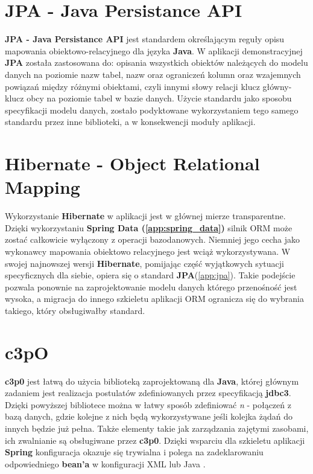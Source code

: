 \section{JPA - Java Persistance API}\label{tech:jpa}
	\textbf{JPA - Java Persistance API} jest standardem określającym reguły opisu mapowania obiektowo-relacyjnego dla języka \textbf{Java}. W aplikacji demonstracyjnej \textbf{JPA} została zastosowana do: opisania wszystkich obiektów należących do modelu danych na poziomie nazw tabel, nazw oraz ograniczeń kolumn oraz wzajemnych powiązań między różnymi obiektami, czyli innymi słowy relacji klucz główny-klucz obcy na poziomie tabel w bazie danych. Użycie standardu jako sposobu specyfikacji modelu danych, zostało podyktowane wykorzystaniem tego samego standardu przez inne biblioteki, a w konsekwencji moduły aplikacji. 
	
\section{Hibernate - Object Relational Mapping}\label{tech:hibernate}
	Wykorzystanie \textbf{Hibernate} w aplikacji jest w głównej mierze transparentne. Dzięki wykorzystaniu \textbf{Spring Data (\ref{app:spring_data})}
	silnik ORM może zostać całkowicie wyłączony z operacji bazodanowych. Niemniej jego cecha jako wykonawcy mapowania obiektowo relacyjnego jest wciąż wykorzystywana. W swojej najnowszej wersji \textbf{Hibernate}, pomijając część wyjątkowych sytuacji specyficznych dla siebie, opiera się o standard \textbf{JPA}(\ref{app:jpa}). Takie podejście pozwala ponownie na zaprojektowanie modelu danych którego przenośność jest wysoka, a migracja do innego szkieletu aplikacji ORM ogranicza się do wybrania takiego, który obsługiwałby standard. 

\section{c3pO}
	\textbf{c3p0} jest łatwą do użycia biblioteką zaprojektowaną dla \textbf{Java}, której głównym zadaniem jest realizacja postulatów zdefiniowanych
	przez specyfikacją \textbf{jdbc3}. Dzięki powyższej bibliotece można w łatwy sposób zdefiniować \emph{n} - połączeń z bazą danych, gdzie kolejne
	z nich będą wykorzystywane jeśli kolejka żądań do innych będzie już pełna. Także elementy takie jak zarządzania zajętymi zasobami, ich zwalnianie są obsługiwane przez \textbf{c3p0}. Dzięki wsparciu dla szkieletu aplikacji \textbf{Spring} konfiguracja okazuje się trywialna i polega na zadeklarowaniu
	odpowiedniego \textbf{bean'a} w konfiguracji XML lub Java \cite{c3p0}.
	
